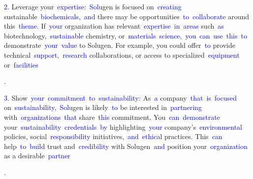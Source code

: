 \documentclass{article}
\begin{document}
\begin{tcolorbox}[colframe=black,colback=white]
{}\textcolor{blue}{2}. Leverage your\textcolor{blue}{~expertise}\textcolor{blue}{:}\textcolor{blue}{~Sol}ugen is focused on\textcolor{blue}{~creating} sustainable\textcolor{blue}{~biochemical}\textcolor{blue}{s}\textcolor{blue}{,}\textcolor{blue}{~and} there may be opportunities\textcolor{blue}{~to}\textcolor{blue}{~collaborate} around this\textcolor{blue}{~theme}\textcolor{blue}{.} If\textcolor{blue}{~your} organization has relevant\textcolor{blue}{~expertise}\textcolor{blue}{~in}\textcolor{blue}{~areas} such\textcolor{blue}{~as} biotechnology\textcolor{blue}{,}\textcolor{blue}{~sustainable} chemistry\textcolor{blue}{,} or\textcolor{blue}{~materials}\textcolor{blue}{~science}\textcolor{blue}{,}\textcolor{blue}{~you}\textcolor{blue}{~can}\textcolor{blue}{~use}\textcolor{blue}{~this}\textcolor{blue}{~to} demonstrate\textcolor{blue}{~your}\textcolor{blue}{~value} to Solugen\textcolor{blue}{.} For example, you could offer\textcolor{blue}{~to} provide technical\textcolor{blue}{~support},\textcolor{blue}{~research} collaborations, or access to specialized\textcolor{blue}{~equipment} or\textcolor{blue}{~facilities}\textcolor{blue}{.

}\textcolor{blue}{3}. Show\textcolor{blue}{~your}\textcolor{blue}{~commitment}\textcolor{blue}{~to}\textcolor{blue}{~sustainability}\textcolor{blue}{:} As\textcolor{blue}{~a} company\textcolor{blue}{~that}\textcolor{blue}{~is}\textcolor{blue}{~focused} on\textcolor{blue}{~sustainability}\textcolor{blue}{,}\textcolor{blue}{~Sol}ugen is likely\textcolor{blue}{~to} be interested in\textcolor{blue}{~partnering} with\textcolor{blue}{~organizations}\textcolor{blue}{~that} share\textcolor{blue}{~this} commitment\textcolor{blue}{.} You\textcolor{blue}{~can}\textcolor{blue}{~demonstrate} your\textcolor{blue}{~sustainability}\textcolor{blue}{~credentials}\textcolor{blue}{~by} highlighting\textcolor{blue}{~your} company's\textcolor{blue}{~environmental} policies, social\textcolor{blue}{~responsibility} initiatives,\textcolor{blue}{~and}\textcolor{blue}{~ethical} practices\textcolor{blue}{.} This\textcolor{blue}{~can} help\textcolor{blue}{~to}\textcolor{blue}{~build} trust and\textcolor{blue}{~credibility} with Solugen\textcolor{blue}{~and} position your\textcolor{blue}{~organization} as a desirable\textcolor{blue}{~partner}\textcolor{blue}{.

}
\end{tcolorbox}
\end{document}
